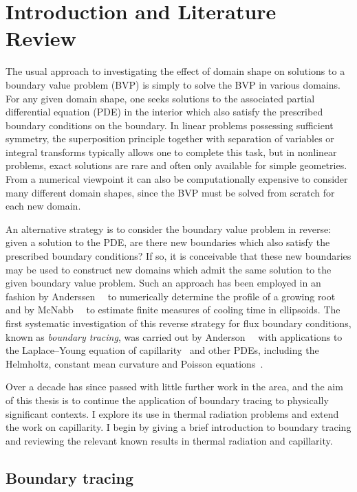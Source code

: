 \chapter{Introduction and Literature Review}

The usual approach
to investigating the effect of domain shape
on solutions to a boundary value problem (BVP)
is simply to solve the BVP in various domains.
For any given domain shape, one seeks solutions
to the associated partial differential equation (PDE) in the interior
which also satisfy the prescribed boundary conditions on the boundary.
In linear problems possessing sufficient symmetry,
the superposition principle
together with separation of variables or integral transforms
typically allows one to complete this task,
but in nonlinear problems,
exact solutions are rare and often only available for simple geometries.
From a numerical viewpoint
it can also be computationally expensive
to consider many different domain shapes,
since the BVP must be solved from scratch for each new domain.

An alternative strategy is to
consider the boundary value problem in reverse:
given a solution to the PDE, are there new boundaries
which also satisfy the prescribed boundary conditions?
If so, it is conceivable that these new boundaries may be used
to construct new domains
which admit the same solution to the given boundary value problem.
Such an approach has been employed in an \adhoc{} fashion
by Anderssen~\etal~\cite{}
to numerically determine the profile of a growing root
and by McNabb~\etal~\cite{}
to estimate finite measures of cooling time in ellipsoids.
The first systematic investigation of this
reverse strategy for flux boundary conditions,
known as \emph{boundary tracing},
was carried out by Anderson~\etal~\cite{}
with applications to the Laplace--Young equation of capillarity~\cite{}
and other PDEs, including the Helmholtz,
constant mean curvature and
Poisson equations~\cite{}.

Over a decade has since passed
with little further work in the area,
and the aim of this thesis is to
continue the application of boundary tracing
to physically significant contexts.
I explore its use in thermal radiation problems
and extend the work on capillarity.
I begin by giving a brief introduction to boundary tracing
and reviewing the relevant known results
in thermal radiation and capillarity.

\section{Boundary tracing}

